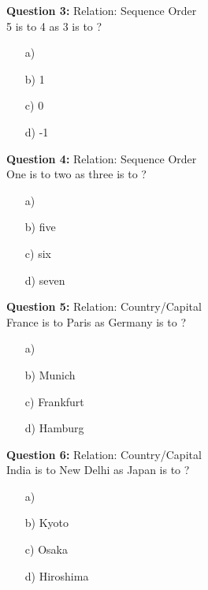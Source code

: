 \documentclass[12pt]{article}
\theoremstyle{definitionstyle}
\begin{document}
\begin{enumerate}
        \textbf{Question 3:} Relation: Sequence Order \\
        5 is to 4 as 3 is to \underline{\hspace{2cm}}?

        \begin{enumerate}
            \item[a)] 
            \item[b)] 1
            \item[c)] 0
            \item[d)] -1
        \end{enumerate}

        \textbf{Question 4:} Relation: Sequence Order \\
        One is to two as three is to \underline{\hspace{2cm}}?

        \begin{enumerate}
            \item[a)] 
            \item[b)] five
            \item[c)] six
            \item[d)] seven
        \end{enumerate}

        \textbf{Question 5:} Relation: Country/Capital \\
        France is to Paris as Germany is to \underline{\hspace{2cm}}?

        \begin{enumerate}
            \item[a)] 
            \item[b)] Munich
            \item[c)] Frankfurt
            \item[d)] Hamburg
        \end{enumerate}

        \textbf{Question 6:} Relation: Country/Capital \\
        India is to New Delhi as Japan is to \underline{\hspace{2cm}}?

        \begin{enumerate}
            \item[a)] 
            \item[b)] Kyoto
            \item[c)] Osaka
            \item[d)] Hiroshima
        \end{enumerate}


\end{enumerate}
\end{document}
